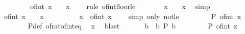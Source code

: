 \begin{isabellebody}
\ \ \isamarkupfalse%
\isanewline
\ \ \ \ \isamarkupfalse%
\ {\isachardoublequoteopen}of{\isacharunderscore}{\kern0pt}int\ {\isasymlfloor}x\ {\isacharminus}{\kern0pt}\ {}{\isasymrfloor}\ {\isasymle}\ x\ {\isacharminus}{\kern0pt}\ {}{\isachardoublequoteclose}\ \isamarkupfalse%
\ {\isacharparenleft}{\kern0pt}rule\ of{\isacharunderscore}{\kern0pt}int{\isacharunderscore}{\kern0pt}floor{\isacharunderscore}{\kern0pt}le{\isacharparenright}{\kern0pt}\isanewline
\ \ \ \ \isamarkupfalse%
\ \isamarkupfalse%
\ {\isachardoublequoteopen}x\ {\isacharminus}{\kern0pt}\ {}\ {\isacharless}{\kern0pt}\ x{\isachardoublequoteclose}\ \isamarkupfalse%
\ simp\isanewline
\ \ \ \ \isamarkupfalse%
\ \isamarkupfalse%
\ {\isachardoublequoteopen}of{\isacharunderscore}{\kern0pt}int\ {\isasymlfloor}x\ {\isacharminus}{\kern0pt}\ {}{\isasymrfloor}\ {\isacharless}{\kern0pt}\ x{\isachardoublequoteclose}\ \isacommand{{\isachardot}{\kern0pt}}\isamarkupfalse%
\isanewline
\ \ \ \ \isamarkupfalse%
\ \isamarkupfalse%
\ {\isachardoublequoteopen}{\isasymnot}\ x\ {\isasymle}\ of{\isacharunderscore}{\kern0pt}int\ {\isasymlfloor}x\ {\isacharminus}{\kern0pt}\ {}{\isasymrfloor}{\isachardoublequoteclose}\ \isamarkupfalse%
\ {\isacharparenleft}{\kern0pt}simp\ only{\isacharcolon}{\kern0pt}\ not{\isacharunderscore}{\kern0pt}le{\isacharparenright}{\kern0pt}\isanewline
\ \ \ \ \isamarkupfalse%
\ \isamarkupfalse%
\ {\isachardoublequoteopen}{\isasymnot}\ P\ {\isacharparenleft}{\kern0pt}of{\isacharunderscore}{\kern0pt}int\ {\isasymlfloor}x\ {\isacharminus}{\kern0pt}\ {}{\isasymrfloor}{\isacharparenright}{\kern0pt}{\isachardoublequoteclose}\isanewline
\ \ \ \ \ \ \isamarkupfalse%
\ P{\isacharunderscore}{\kern0pt}def\ of{\isacharunderscore}{\kern0pt}rat{\isacharunderscore}{\kern0pt}of{\isacharunderscore}{\kern0pt}int{\isacharunderscore}{\kern0pt}eq\ \isamarkupfalse%
\ x\ \isamarkupfalse%
\ blast\isanewline
\ \ \isamarkupfalse%
\isanewline
\ \ \isamarkupfalse%
\ b\ \ b{\isacharcolon}{\kern0pt}\ {\isachardoublequoteopen}P\ b{\isachardoublequoteclose}\isanewline
\ \ \isamarkupfalse%
\isanewline
\ \ \ \ \isamarkupfalse%
\ {\isachardoublequoteopen}P\ {\isacharparenleft}{\kern0pt}of{\isacharunderscore}{\kern0pt}int\ {\isasymlceil}z{\isasymrceil}{\isacharparenright}{\kern0pt}{\isachardoublequoteclose}\isanewline

\end{isabellebody}
